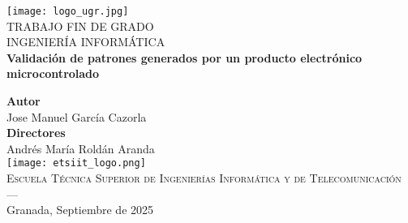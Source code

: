 \begin{titlepage}
    \newlength{\centeroffset}
    \setlength{\centeroffset}{-0.5\oddsidemargin}
    \addtolength{\centeroffset}{0.5\evensidemargin}
    \thispagestyle{empty}

    \noindent\hspace*{\centeroffset}

    \begin{minipage}{\textwidth}
        \centering

        \texttt{[image: logo\_ugr.jpg]}\\[1.4cm]

        \textsc{\Large TRABAJO FIN DE GRADO\\[0.2cm]}
        \textsc{INGENIERÍA INFORMÁTICA}\\[1cm]

        \Huge\bfseries Validación de patrones generados por un producto electrónico microcontrolado 
    \end{minipage}

    \vspace{2.5cm}
    \noindent\hspace*{\centeroffset}

    \begin{minipage}{\textwidth}
        \centering

        \textbf{Autor}\\{Jose Manuel García Cazorla}\\[2.5ex]
        \textbf{Directores}\\{Andrés María Roldán Aranda}\\[2.5ex]

        \texttt{[image: etsiit\_logo.png]}\\[0.1cm]

        \textsc{Escuela Técnica Superior de Ingenierías Informática y de Telecomunicación}\\
        \textsc{---}\\
        Granada, Septiembre de 2025
    \end{minipage}
\end{titlepage}
